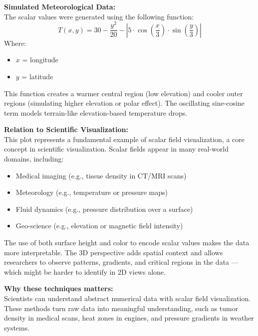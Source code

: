 \documentclass[11pt]{article}
\begin{document}
	\vspace{0.5em}
	\noindent
	\textbf{Simulated Meteorological Data:} \\
	The scalar values were generated using the following function:
	\[
	T(x, y) = 30 - \frac{y^2}{20} - \left|5 \cdot \cos\left(\frac{x}{3}\right) \cdot \sin\left(\frac{y}{3}\right)\right|
	\]
	Where:
	\begin{itemize}
		\item $x$ = longitude
		\item $y$ = latitude
	\end{itemize}
	
	This function creates a warmer central region (low elevation) and cooler outer regions (simulating higher elevation or polar effect). The oscillating sine-cosine term models terrain-like elevation-based temperature drops.
	
	\vspace{1em}
	\noindent
	\textbf{Relation to Scientific Visualization:} \\
	This plot represents a fundamental example of scalar field visualization, a core concept in scientific visualization. Scalar fields appear in many real-world domains, including:
	
	\begin{itemize}
	    \item Medical imaging (e.g., tissue density in CT/MRI scans)
	    \item Meteorology (e.g., temperature or pressure maps) 
	    \item Fluid dynamics (e.g., pressure distribution over a surface)
	    \item Geo-science (e.g., elevation or magnetic field intensity)
	\end{itemize}
	
	The use of both surface height and color to encode scalar values makes the data more interpretable. The 3D perspective adds spatial context and allows researchers to observe patterns, gradients, and critical regions in the data — which might be harder to identify in 2D views alone.
	
	\vspace{1em}
	\noindent
	\textbf{Why these techniques matters:} \\
	Scientists can understand abstract numerical data with scalar field visualization. These methods turn raw data into meaningful understanding, such as tumor density in medical scans, heat zones in engines, and pressure gradients in weather systems.
	
\end{document}

